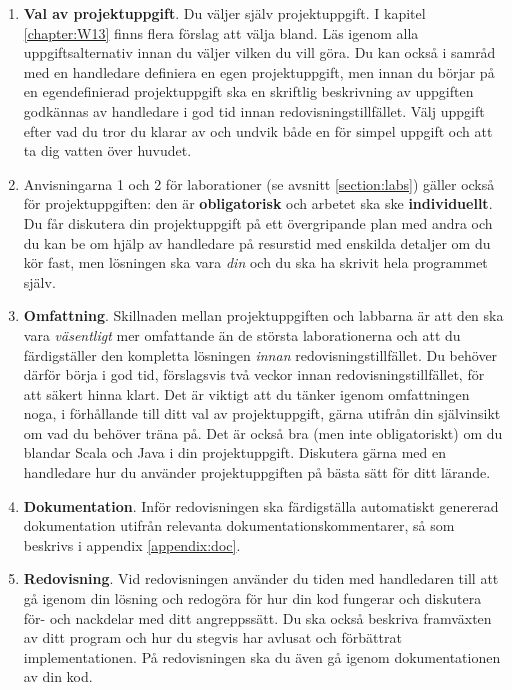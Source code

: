 \begin{enumerate}
\item \textbf{Val av projektuppgift}.
Du väljer själv projektuppgift. I kapitel \ref{chapter:W13} finns flera förslag att välja bland. Läs igenom alla uppgiftsalternativ innan du väljer vilken du vill göra. Du kan också i samråd med en handledare definiera en egen projektuppgift, men innan du börjar på en egendefinierad projektuppgift ska en skriftlig beskrivning av uppgiften godkännas av handledare i god tid innan redovisningstillfället. Välj uppgift efter vad du tror du klarar av och undvik både en för simpel uppgift och att ta dig vatten över huvudet.

\item
Anvisningarna 1 och 2 för laborationer (se avsnitt \ref{section:labs}) gäller också för projektuppgiften: den är \textbf{obligatorisk} och arbetet ska ske \textbf{individuellt}.
Du får diskutera din projektuppgift på ett övergripande plan med andra och du kan be om hjälp av handledare på resurstid med enskilda detaljer om du kör fast, men lösningen ska vara \emph{din} och du ska ha skrivit hela programmet själv.


\item \textbf{Omfattning}.
Skillnaden mellan projektuppgiften och labbarna är att den ska vara \emph{väsentligt} mer omfattande än de största laborationerna och att du färdigställer den kompletta lösningen  \emph{innan} redovisningstillfället. Du behöver därför börja i god tid, förslagsvis två veckor innan redovisningstillfället, för att säkert hinna klart. Det är viktigt att du tänker igenom omfattningen noga, i förhållande till ditt val av projektuppgift, gärna utifrån din självinsikt om vad du behöver träna på. Det är också bra (men inte obligatoriskt) om du blandar Scala och Java i din projektuppgift. Diskutera gärna med en handledare hur du använder projektuppgiften på bästa sätt för ditt lärande.

\item \textbf{Dokumentation}. Inför redovisningen ska färdigställa automatiskt genererad dokumentation utifrån relevanta dokumentationskommentarer, så som beskrivs i appendix \ref{appendix:doc}. 

\item \textbf{Redovisning}.
Vid redovisningen använder du tiden med handledaren till att gå igenom din lösning och redogöra för hur din kod fungerar och diskutera för- och nackdelar med ditt angreppssätt. Du ska också beskriva framväxten av ditt program och hur du stegvis har avlusat och förbättrat implementationen. På redovisningen ska du även gå igenom dokumentationen av din kod.

\end{enumerate}


